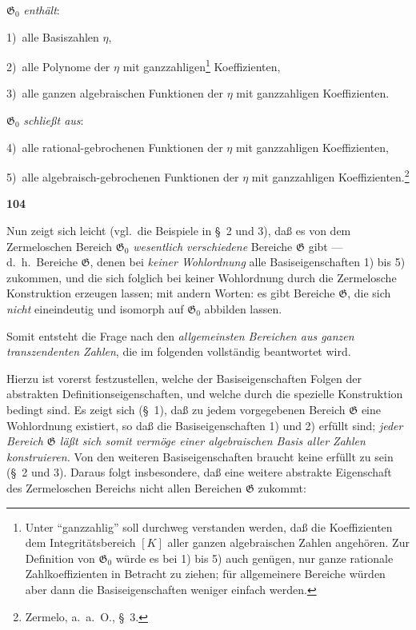 \documentclass[12pt,a4paper]{article}
\begin{document}
\smallskip
$\mathfrak{G}_0$ \emph{enth\"alt}:

1)\ alle Basiszahlen $\eta$,

2)\ alle Polynome der $\eta$ mit ganzzahligen\footnote{Unter ``ganzzahlig'' soll durchweg verstanden werden, da\ss{} die Koeffizienten dem Integrit\"atsbereich $[K]$ aller ganzen algebraischen Zahlen angeh\"oren. Zur Definition von $\mathfrak{G}_0$ w\"urde es bei 1) bis 5) auch gen\"ugen, nur ganze rationale Zahlkoeffizienten in Betracht zu ziehen; f\"ur allgemeinere Bereiche w\"urden aber dann die Basiseigenschaften weniger einfach werden.} Koeffizienten,

3)\ alle ganzen algebraischen Funktionen der $\eta$ mit ganzzahligen Koeffizienten.

\smallskip
$\mathfrak{G}_0$ \emph{schlie\ss t aus}:

4)\ alle rational-gebrochenen Funktionen der $\eta$ mit ganzzahligen Koeffizienten,

5)\ alle algebraisch-gebrochenen Funktionen der $\eta$ mit ganzzahligen Koeffizienten.\footnote{Zermelo, a.\ a.\ O., \S\ 3.}

\newpage
\begin{center}
\textbf{104}
\end{center}

Nun zeigt sich leicht (vgl.\ die Beispiele in \S\ 2 und 3), da\ss{} es von dem Zermeloschen Bereich $\mathfrak{G}_0$ \emph{wesentlich verschiedene} Bereiche $\mathfrak{G}$ gibt --- d.\ h.\ Bereiche $\mathfrak{G}$, denen bei \emph{keiner Wohlordnung} alle Basiseigenschaften 1) bis 5) zukommen, und die sich folglich bei keiner Wohlordnung durch die Zermelosche Konstruktion erzeugen lassen; mit andern Worten: es gibt Bereiche $\mathfrak{G}$, die sich \emph{nicht} eineindeutig und isomorph auf $\mathfrak{G}_0$ abbilden lassen.

Somit entsteht die Frage nach den \emph{allgemeinsten Bereichen aus ganzen transzendenten Zahlen}, die im folgenden vollst\"andig beantwortet wird.

Hierzu ist vorerst festzustellen, welche der Basiseigenschaften Folgen der abstrakten Definitionseigenschaften, und welche durch die spezielle Konstruktion bedingt sind. Es zeigt sich (\S\ 1), da\ss{} zu jedem vorgegebenen Bereich $\mathfrak{G}$ eine Wohlordnung existiert, so da\ss{} die Basiseigenschaften 1) und 2) erf\"ullt sind; \emph{jeder Bereich $\mathfrak{G}$ l\"a\ss t sich somit verm\"oge einer algebraischen Basis aller Zahlen konstruieren.} Von den weiteren Basiseigenschaften braucht keine erf\"ullt zu sein (\S\ 2 und 3). Daraus folgt insbesondere, da\ss{} eine weitere abstrakte Eigenschaft des Zermeloschen Bereichs nicht allen Bereichen $\mathfrak{G}$ zukommt:
\end{document}
